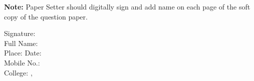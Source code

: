 \documentclass[12pt,a4paper]{article}
\begin{document}
{\vspace{0.5em}
\textbf{Note:} Paper Setter should digitally sign and add name on each page of the soft copy of the question paper.

\vspace{1.5em}

Signature: \underline{\hspace{6cm}} \\
Full Name: \salutation\ \name \\
Place: \place \hfill Date: \underline{\hspace{3cm}} \\
Mobile No.: \underline{\hspace{6cm}} \\
College: \institute, \place

}
\end{document}
